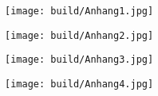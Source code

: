 \begin{figure*}
    \centering
    \texttt{[image: build/Anhang1.jpg]}
\end{figure*}
\begin{figure*}
    \centering
    \texttt{[image: build/Anhang2.jpg]}
\end{figure*}
\begin{figure*}
    \centering
    \texttt{[image: build/Anhang3.jpg]}
\end{figure*}
\begin{figure*}
    \centering
    \texttt{[image: build/Anhang4.jpg]}
\end{figure*}